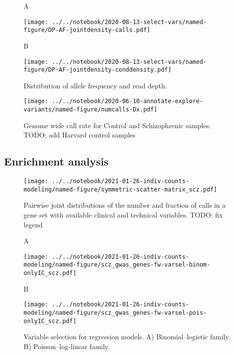 \documentclass[letterpaper]{article}
\begin{document}
\begin{figure}
A

\texttt{[image: ../../notebook/2020-08-13-select-vars/named-figure/DP-AF-jointdensity-calls.pdf]}

B

\texttt{[image: ../../notebook/2020-08-13-select-vars/named-figure/DP-AF-jointdensity-conddensity.pdf]}
\caption{Distribution of allele frequency and read depth.}
\end{figure}

\begin{figure}
\texttt{[image: ../../notebook/2020-06-10-annotate-explore-variants/named-figure/numcalls-Dx.pdf]}

\caption{Genome wide call rate for Control and Schizophrenic samples.  TODO:
	add Harvard control samples}
\end{figure}

\subsection*{Enrichment analysis}

\begin{figure}
\texttt{[image: ../../notebook/2021-01-26-indiv-counts-modeling/named-figure/symmetric-scatter-matrix\_scz.pdf]}

\caption{Pairwise joint distributions of the number and fraction of calls in a
	gene set with available clinical and technical variables.  TODO: fix
	legend}
\end{figure}

\begin{figure}
A

\texttt{[image: ../../notebook/2021-01-26-indiv-counts-modeling/named-figure/scz\_gwas\_genes-fw-varsel-binom-onlyIC\_scz.pdf]}

B

\texttt{[image: ../../notebook/2021-01-26-indiv-counts-modeling/named-figure/scz\_gwas\_genes-fw-varsel-pois-onlyIC\_scz.pdf]}
\caption{Variable selection for regression models. A) Binomial--logistic
	family.  B) Poisson--log-linear family.}
\end{figure}
\end{document}
